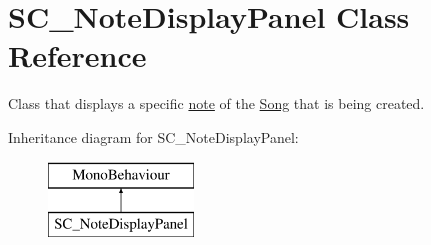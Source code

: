 \hypertarget{class_s_c___note_display_panel}{}\section{S\+C\+\_\+\+Note\+Display\+Panel Class Reference}
\label{class_s_c___note_display_panel}


Class that displays a specific \hyperlink{group___music_structs_struct_music_1_1_combined_note}{note} of the \hyperlink{class_song}{Song} that is being created.  


Inheritance diagram for S\+C\+\_\+\+Note\+Display\+Panel\+:\begin{figure}[H]
\begin{center}
\leavevmode
\includegraphics[height=2.000000cm]{class_s_c___note_display_panel}
\end{center}
\end{figure}
